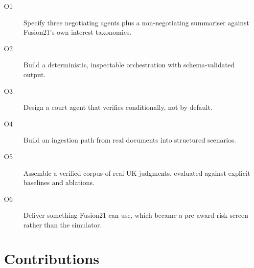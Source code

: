 \begin{description}
  \item[O1] Specify three negotiating agents plus a non-negotiating summariser
    against Fusion21's own interest taxonomies.
  \item[O2] Build a deterministic, inspectable orchestration with
    schema-validated output.
  \item[O3] Design a court agent that verifies conditionally, not by
    default.
  \item[O4] Build an ingestion path from real documents into structured
    scenarios.
  \item[O5] Assemble a verified corpus of real UK judgments, evaluated
    against explicit baselines and ablations.
  \item[O6] Deliver something Fusion21 can use, which became a pre-award
    risk screen rather than the simulator.
\end{description}

\section{Contributions}
\label{sec:contributions}

